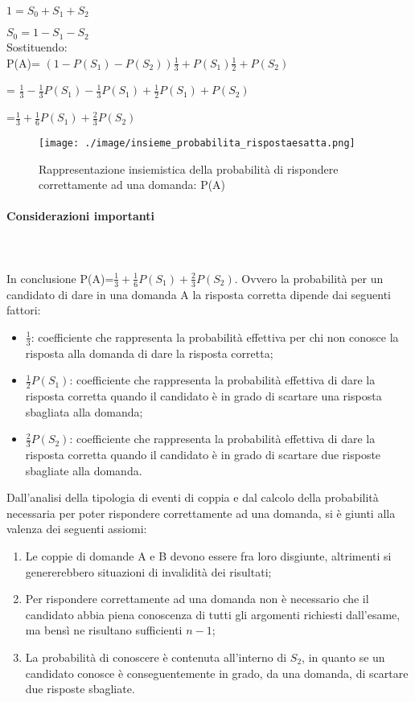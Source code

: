 $1=S_{0}+S_{1}+S_{2}$

$S_0=1-S_{1}-S_{2}$ \\

Sostituendo: \\

P(A)= $(1-P(S_1) - P(S_2))\frac{1}{3}+P(S_1)\frac{1}{2}+P(S_2)$

    = $\frac{1}{3}-\frac{1}{3}P(S_1)-\frac{1}{3}P(S_1)+\frac{1}{2}P(S_1)+P(S_2)$
    
    =$\frac{1}{3}+\frac{1}{6}P(S_1)+\frac{2}{3}P(S_2)$
   

\begin{figure}[H]
\centering
	\texttt{[image: ./image/insieme\_probabilita\_rispostaesatta.png]}
	\caption{Rappresentazione insiemistica della probabilit\`a di rispondere correttamente ad una domanda: P(A)}
\end{figure}
  
  
  
 \paragraph{Considerazioni importanti} \mbox{}\\\\
 \label{Considerazioni importanti}
  In conclusione P(A)=$\frac{1}{3}+\frac{1}{6}P(S_1)+\frac{2}{3}P(S_2)$.
  Ovvero la probabilit\`a  per un candidato di dare in una domanda A la risposta corretta dipende dai seguenti fattori:
  \begin{itemize}
  \item $\frac{1}{3}$: coefficiente che rappresenta la probabilit\`a effettiva per chi non conosce la risposta alla domanda di dare la risposta corretta;
  \item $\frac{1}{2}P(S_1)$: coefficiente che rappresenta la probabilit\`a effettiva di  dare la risposta corretta quando il candidato \`e in grado di scartare una risposta sbagliata alla domanda;
   \item $\frac{2}{3}P(S_2)$: coefficiente che rappresenta la probabilit\`a effettiva di  dare la risposta corretta quando il candidato \`e in grado di scartare due risposte sbagliate alla domanda.
  \end{itemize}
  \noindent
  Dall'analisi della tipologia di eventi di coppia e dal calcolo della probabilit\`a necessaria per poter rispondere correttamente ad una domanda, si \`e giunti alla valenza dei seguenti assiomi:
  \begin{enumerate}
  \item Le coppie di domande A e B devono essere fra loro disgiunte, altrimenti si genererebbero situazioni di invalidit\`a dei risultati;
  \item Per rispondere correttamente ad una domanda non \`e necessario che il candidato abbia piena conoscenza di tutti gli argomenti richiesti dall'esame, ma bens\`i ne risultano sufficienti $n-1$;
  \item La probabilit\`a di conoscere \`e contenuta all'interno di $S_{2}$, in quanto se un candidato conosce \`e conseguentemente in grado, da una domanda, di scartare due risposte sbagliate.
  \end{enumerate}
  
